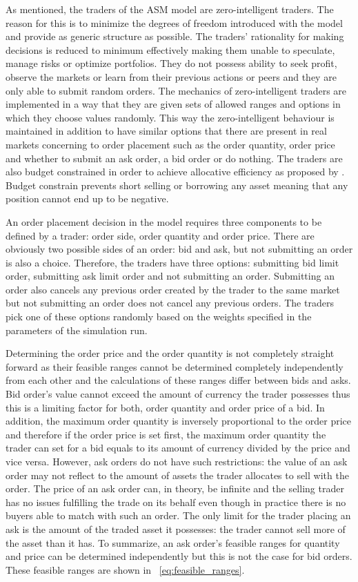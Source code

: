 As mentioned, the traders of the ASM model are zero-intelligent
traders. The reason for this is to minimize the degrees of freedom introduced with
the model and provide as generic structure as possible. The traders' rationality 
for making decisions is reduced to minimum effectively making them unable to speculate, 
manage risks or optimize portfolios. They do not possess ability to seek profit, 
observe the markets or learn from their previous actions or peers and
they are only able to submit random orders. The mechanics of zero-intelligent traders
are implemented in a way that they are given sets of allowed ranges 
and options in which they choose values randomly. This way the zero-intelligent behaviour is maintained
in addition to have similar options that there are present in real markets 
concerning to order placement such as the order quantity, order price and whether
to submit an ask order, a bid order or do nothing. The traders are also budget constrained
in order to achieve allocative efficiency as proposed by
\citet{God93}. Budget constrain prevents short selling or borrowing any asset meaning that 
any position cannot end up to be negative.


An order placement decision in the model requires three components 
to be defined by a trader: order side, order quantity and order price. 
There are obviously two possible sides of an order: bid and ask, but
not submitting an order is also a choice. Therefore, the traders
have three options: submitting bid limit order, submitting ask limit order
and not submitting an order. Submitting an order also cancels any previous
order created by the trader to the same market but not submitting an order does not
cancel any previous orders. The traders pick one of these options randomly 
based on the weights specified in the parameters of the simulation run. 

Determining the order price and the order quantity is not completely straight
forward as their feasible ranges cannot be determined completely independently
from each other and the calculations of these ranges differ between bids and asks. Bid order's
value cannot exceed the amount of currency the trader possesses thus this is 
a limiting factor for both, order quantity and order price of a bid. In addition,
the maximum order quantity is inversely proportional to the order price and
therefore if the order price is set first, the maximum order quantity the trader
can set for a bid equals to its amount of currency divided by the price and vice versa. 
However, ask orders do not have such restrictions: the value of an ask order
may not reflect to the amount of assets the trader allocates to sell with the order. The
price of an ask order can, in theory, be infinite and the selling trader has no issues
fulfilling the trade on its behalf even though in practice there is no buyers
able to match with such an order. The only limit for the trader placing an ask is the 
amount of the traded asset it possesses: the trader cannot sell more of the asset 
than it has. To summarize, an ask order's feasible ranges for quantity and price 
can be determined independently but this is not the case for bid orders. These feasible 
ranges are shown in ~\ref{eq:feasible_ranges}.

